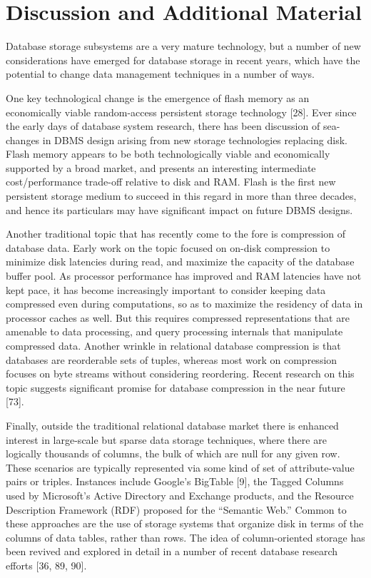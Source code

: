 \documentclass[b5paper,11pt,twoside,openright]{book}
\begin{document}
\hypertarget{discussion-and-additional-material-3}{%
\section{Discussion and Additional
Material}\label{discussion-and-additional-material-3}}

Database storage subsystems are a very mature technology, but a number
of new considerations have emerged for database storage in recent years,
which have the potential to change data management techniques in a
number of ways.

One key technological change is the emergence of flash memory as an
economically viable random-access persistent storage technology
{[}28{]}. Ever since the early days of database system research, there
has been discussion of sea-changes in DBMS design arising from new
storage technologies replacing disk. Flash memory appears to be both
technologically viable and economically supported by a broad market,
and presents an interesting intermediate cost/performance trade-off
relative to disk and RAM. Flash is the first new persistent storage
medium to succeed in this regard in more than three decades, and hence
its particulars may have significant impact on future DBMS designs.

Another traditional topic that has recently come to the fore is
compression of database data. Early work on the topic focused on
on-disk compression to minimize disk latencies during read, and maximize
the capacity of the database buffer pool. As processor performance has
improved and RAM latencies have not kept pace, it has become
increasingly important to consider keeping data compressed even during
computations, so as to maximize the residency of data in processor
caches as well. But this requires compressed representations that are
amenable to data processing, and query processing internals that
manipulate compressed data. Another wrinkle in relational database
compression is that databases are reorderable sets of tuples, whereas
most work on compression focuses on byte streams without considering
reordering. Recent research on this topic suggests significant promise
for database compression in the near future {[}73{]}.

Finally, outside the traditional relational database market there is
enhanced interest in large-scale but sparse data storage techniques,
where there are logically thousands of columns, the bulk of which are
null for any given row. These scenarios are typically represented via
some kind of set of attribute-value pairs or triples. Instances include
Google's BigTable {[}9{]}, the Tagged Columns used by Microsoft's Active
Directory and Exchange products, and the Resource Description Framework
(RDF) proposed for the ``Semantic Web.'' Common to these approaches are
the use of storage systems that organize disk in terms of the columns of
data tables, rather than rows. The idea of column-oriented storage has
been revived and explored in detail in a number of recent database
research efforts {[}36, 89, 90{]}.
\end{document}
